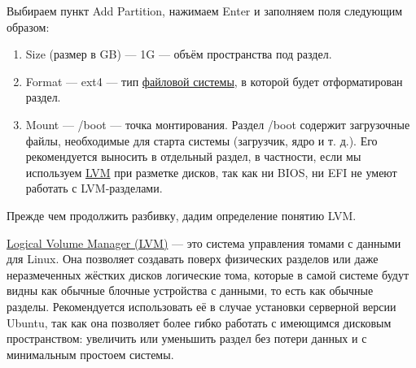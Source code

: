 \documentclass[14pt, a4paper]{article}
\begin{document}
Выбираем пункт Add Partition, нажимаем Enter и заполняем поля следующим образом:

\begin{enumerate}
    \item Size (размер в GB) — 1G — объём пространства под раздел.
    \item Format — ext4 — тип \href{https://losst.ru/tipy-fajlovyh-sistem-dlya-linux}{файловой системы}, в которой будет отформатирован раздел.
    \item Mount — /boot — точка монтирования. Раздел /boot содержит загрузочные файлы,
    необходимые для старта системы (загрузчик, ядро и т. д.). Его рекомендуется выносить в
    отдельный раздел, в частности, если мы используем \href{https://ru.wikipedia.org/wiki/LVM}{LVM} при разметке дисков, так как ни
    BIOS, ни EFI не умеют работать с LVM-разделами.
\end{enumerate}

\begin{figure}[H]%
    \centering
    \label{1.6} %
\end{figure}

Прежде чем продолжить разбивку, дадим определение понятию LVM.

\href{https://help.ubuntu.ru/wiki/lvm}{Logical Volume Manager (LVM)} — это система управления томами с данными для Linux. Она
позволяет создавать поверх физических разделов или даже неразмеченных жёстких дисков
логические тома, которые в самой системе будут видны как обычные блочные устройства с данными,
то есть как обычные разделы. Рекомендуется использовать её в случае установки серверной версии
Ubuntu, так как она позволяет более гибко работать с имеющимся дисковым пространством:
увеличить или уменьшить раздел без потери данных и с минимальным простоем системы.
\end{document}
